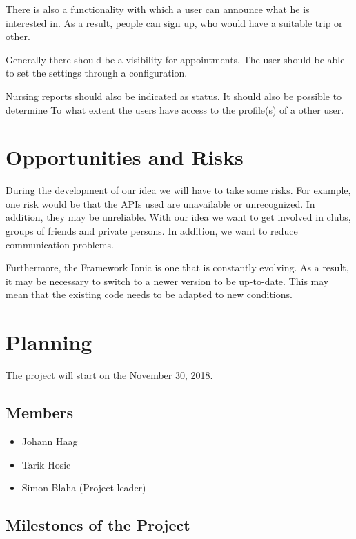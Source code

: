 \documentclass[12pt]{scrartcl}
\begin{document}
        There is also a functionality with which a user can announce what he is interested in.
        As a result, people can sign up, who would have a suitable trip or other.
        
        Generally there should be a visibility for appointments.
        The user should be able to set the settings through a configuration.
        
        Nursing reports should also be indicated as status. It should also be possible to determine
        To what extent the users have access to the profile(s) of a other user.
    \pagebreak

    \section{Opportunities and Risks}
        During the development of our idea we will have to take some risks. For example, one risk would be that the APIs used are unavailable or unrecognized. In addition, they may be unreliable.
        With our idea we want to get involved in clubs, groups of friends and private persons.
        In addition, we want to reduce communication problems.

       
        Furthermore, the Framework Ionic is one that is constantly evolving. As a result, it may be necessary to switch to a newer version to be up-to-date.
        This may mean that the existing code needs to be adapted to new conditions.
    \pagebreak

    \section{Planning}

    \vspace*{15pt}

    The project will start on the November 30, 2018.

    \subsection{Members}
    \begin{itemize}
        \item Johann Haag
        \item Tarik Hosic
        \item Simon Blaha (Project leader)
    \end{itemize}

    \subsection{Milestones of the Project}
    
\end{document}
